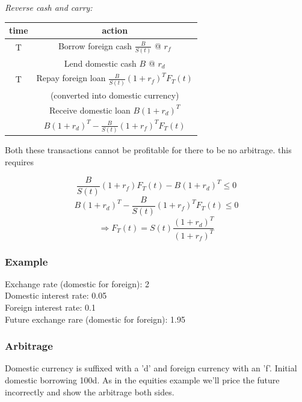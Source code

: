 \textit{Reverse cash and carry:}

\begin{center} \begin{tabular}{|c|c|}
  \hline
  time & action \\
  \hline
  T  & Borrow foreign cash $\frac{B}{S(t)}$ @ $r_f$ \\
    & Lend domestic cash $B$ @ $r_d$  \\
  \hline
  T & Repay foreign loan $\frac{B}{S(t)}(1+r_f)^{T}F_T(t)$  \\
    & (converted into domestic currency) \\
   & Receive domestic loan $B(1+r_d)^{T}$ \\
  \hline
   & $B(1+r_d)^{T}-\frac{B}{S(t)}(1+r_f)^{T}F_T(t)$\\
  \hline
\end{tabular}\end{center}


Both these transactions cannot be profitable for there to be no arbitrage. this requires

\[\frac{B}{S(t)}(1+r_f)F_T(t)-B(1+r_d)^{T} \leq 0 \]
\[B(1+r_d)^{T}-\frac{B}{S(t)}(1+r_f)^{T}F_T(t) \leq 0 \]
\[ \Rightarrow F_{T}(t) = S(t)\frac{(1+r_d)^{T}}{(1+r_f)^{T}}  \]



\subsubsection{Example}


Exchange rate (domestic for foreign): 2\\
Domestic interest rate: 0.05\\
Foreign interest rate: 0.1\\
Future exchange rare (domestic for foreign): 1.95\\

\subsubsection{Arbitrage}

Domestic currency is suffixed with a 'd' and foreign currency with an 'f'. Initial domestic borrowing 100d. As in the equities example we'll price the future incorrectly and show the arbitrage both sides.

